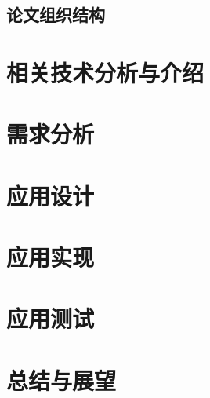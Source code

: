 \documentclass{ecnuthesis}
\begin{document}
    \section{论文组织结构}\label{sec:structure}


    \chapter{相关技术分析与介绍}\label{ch:tech}


    \chapter{需求分析}\label{ch:requirement}


    \chapter{应用设计}\label{ch:design}


    \chapter{应用实现}\label{ch:implement}


    \chapter{应用测试}\label{ch:test}


    \chapter{总结与展望}\label{ch:conclusion}


    \backmatter
    \PrintReference

    \begin{appendix}
    \end{appendix}

    \begin{acknowledgement}
    \end{acknowledgement}
\end{document}
